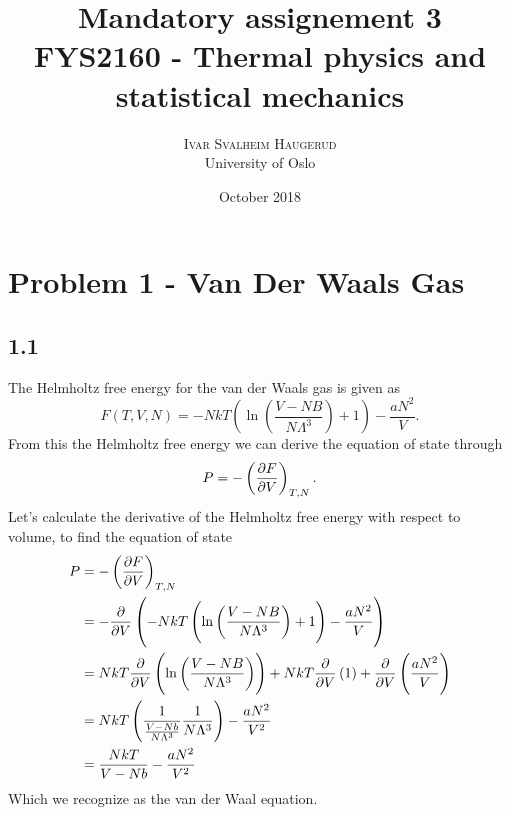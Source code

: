 \documentclass[a4paper,10pt, english]{article}
\title{Mandatory assignement 3\\
FYS2160 - Thermal physics and statistical mechanics}
\author{\textsc{Ivar Svalheim Haugerud}\\University of Oslo}
\date{October 2018}
\begin{document}
\maketitle

\section*{Problem 1 - Van Der Waals Gas}
\subsection*{1.1}
The Helmholtz free energy for the van der Waals gas is given as
\begin{equation}
    F(T, V, N) = -NkT\left(\ln{\left(\frac{V-NB}{N\Lambda^3}\right)}+1\right)-\frac{aN^2}{V}.
\end{equation}
From this the Helmholtz free energy we can derive the equation of state through
\begin{equation}
    P =-\left(\pdv{F}{V}\right)_{T,N}.
\end{equation}
Let's calculate the derivative of the Helmholtz free energy with respect to volume, to find the equation of state
\begin{align*}
    P &= -\left(\pdv{F}{V}\right)_{T,N} \\
      &= -\pdv{}{V}\left(-NkT\left(\ln{\left(\frac{V-NB}{N\Lambda^3}\right)}+1\right)-\frac{aN^2}{V}\right) \\
      &= NkT\pdv{}{V}\left(\ln{\left(\frac{V-NB}{N\Lambda^3}\right)}\right) + NkT\pdv{}{V}\left(1\right) + \pdv{}{V}\left(\frac{aN^2}{V}\right) \\
      &= NkT\left(\frac{1}{\frac{V-Nb}{N\Lambda^3}}\frac{1}{N\Lambda^3}\right) - \frac{aN^2}{V^2} \\
      &= \frac{NkT}{V-Nb} - \frac{aN^2}{V^2}
\end{align*}
Which we recognize as the van der Waal equation.
\end{document}

